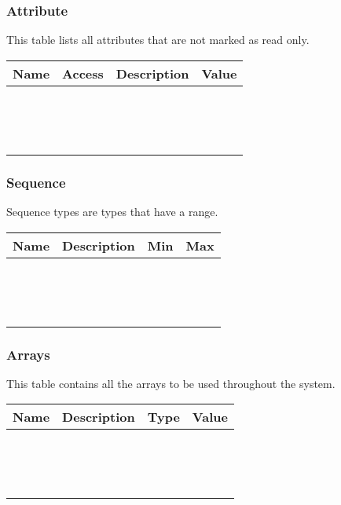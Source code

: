 \newpage
\subsubsection{Attribute}

This table lists all attributes that are not marked as read only.

\begin{table}[H]
\centering
\small
    \begin{tabular}{|l|l|l|l|}
    \hline
    \textbf{Name} & \textbf{Access} & \textbf{Description} & \textbf{Value} \\ \hline
    ~    & ~      & ~           & ~     \\ \hline
    ~    & ~      & ~           & ~     \\ \hline
    ~    & ~      & ~           & ~     \\ \hline
    \end{tabular}
\end{table}

\newpage
\subsubsection{Sequence}

Sequence types are types that have a range.

\begin{table}[H]
\centering
\small
    \begin{tabular}{|l|l|l|l|}
    \hline
    \textbf{Name} & \textbf{Description} & \textbf{Min} & \textbf{Max} \\ \hline
    ~    & ~           & ~   & ~   \\ \hline
    ~    & ~           & ~   & ~   \\ \hline
    ~    & ~           & ~   & ~   \\ \hline
    \end{tabular}
\end{table}

\newpage
\subsubsection{Arrays}

This table contains all the arrays to be used throughout the system.

\begin{table}[H]
\centering
\small
    \begin{tabular}{|l|l|l|l|}
    \hline
    \textbf{Name} & \textbf{Description} & \textbf{Type} & \textbf{Value} \\ \hline
    ~    & ~           & ~    & ~     \\ \hline
    ~    & ~           & ~    & ~     \\ \hline
    ~    & ~           & ~    & ~     \\ \hline
    \end{tabular}
\end{table}
